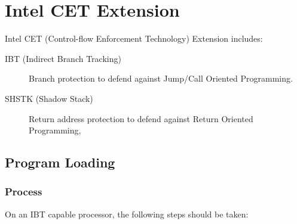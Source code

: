 \chapter{Intel CET Extension}

Intel CET (Control-flow Enforcement Technology) Extension includes:

\begin{description}
  \item[IBT (Indirect Branch Tracking)] Branch protection to defend
    against Jump/Call Oriented Programming.
  \item [SHSTK (Shadow Stack)] Return address protection to defend
    against Return Oriented Programming,
\end{description}

\section{Program Loading}

\subsection{Process }
\label{ibt}

On an IBT capable processor, the following steps should be taken:

